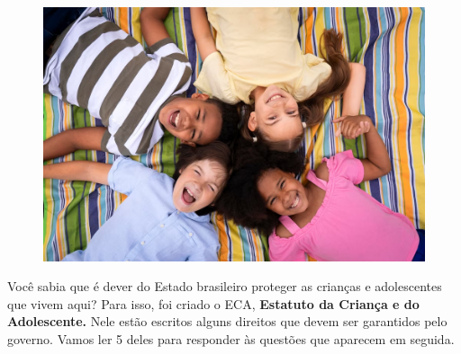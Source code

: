 
\begin{figure}[htpb!]
\centering
\includegraphics[width=.5\textwidth]{./imgs/img47.png}
\end{figure}

\noindent{}Você sabia que é dever do Estado brasileiro proteger as crianças e
adolescentes que vivem aqui? Para isso, foi criado o ECA,
\textbf{Estatuto da Criança e do Adolescente.} Nele estão escritos
alguns direitos que devem ser garantidos pelo governo. Vamos ler 5
deles para responder às questões que aparecem em seguida.

